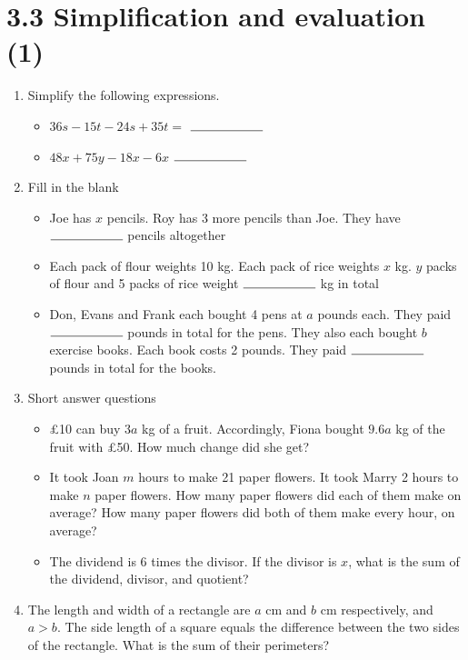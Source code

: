 \documentclass{article}%
\begin{document}
%
\section*{3.3 Simplification and evaluation (1)}%
\begin{enumerate}%
\item%
Simplify the following expressions.%
\begin{itemize}%
\item%
$36s-15t-24s+35t=$ $\rule{2cm}{0.15mm}$%
\item%
$48x+75y-18x-6x$ $\rule{2cm}{0.15mm}$%
\end{itemize}%
\item%
Fill in the blank%
\begin{itemize}%
\item%
Joe has $x$ pencils. Roy has 3 more pencils than Joe. They have $\rule{2cm}{0.15mm}$ pencils altogether%
\item%
Each pack of flour weights 10 kg. Each pack of rice weights $x$ kg. $y$ packs of flour and 5 packs of rice weight $\rule{2cm}{0.15mm}$ kg in total%
\item%
Don, Evans and Frank each bought 4 pens at $a$ pounds each. They paid $\rule{2cm}{0.15mm}$ pounds in total for the pens. They also each bought $b$ exercise books. Each book costs 2 pounds. They paid $\rule{2cm}{0.15mm}$ pounds in total for the books.%
\end{itemize}%
\item%
Short answer questions%
\begin{itemize}%
\item%
\pounds10 can buy $3a$ kg of a fruit. Accordingly, Fiona bought $9.6a$ kg of the fruit with \pounds50. How much change did she get?%
\item%
It took Joan $m$ hours to make 21 paper flowers. It took Marry 2 hours to make $n$ paper flowers. How many paper flowers did each of them make on average? How many paper flowers did both of them make every hour, on average?%
\item%
The dividend is 6 times the divisor. If the divisor is $x$, what is the sum of the dividend, divisor, and quotient?%
\end{itemize}%
\item%
The length and width of a rectangle are $a$ cm and $b$ cm respectively, and $a>b$. The side length of a square equals the difference between the two sides of the rectangle. What is the sum of their perimeters?%
\end{enumerate}
\end{document}
